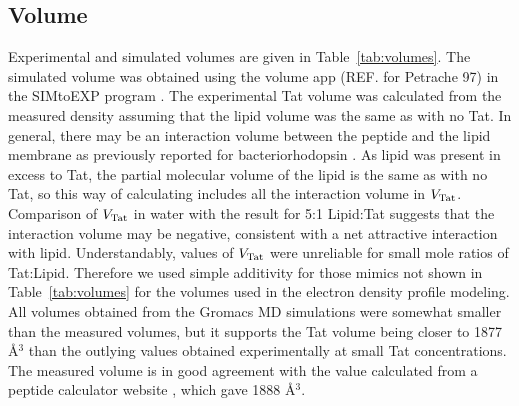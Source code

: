 \subsection{Volume}\label{sec:volume_results}
Experimental and simulated volumes are given in Table~\ref{tab:volumes}. The simulated volume was
obtained using the volume app (REF. for Petrache 97) in the SIMtoEXP program \cite{Kucerka10}. The experimental Tat volume was
calculated from the measured density assuming that the lipid volume was the same as with no
Tat. In general, there may be an interaction volume between the peptide and the lipid membrane
as previously reported for bacteriorhodopsin \cite{Tristram-Nagle86}. As lipid was present in excess to Tat, the
partial molecular volume of the lipid is the same as with no Tat, so this way of
calculating includes all the interaction volume in $V_\textrm{Tat}$. Comparison of $V_\textrm{Tat}$ in water with the
result for 5:1 Lipid:Tat suggests that the interaction volume may be negative, consistent with a
net attractive interaction with lipid. Understandably, values of $V_\textrm{Tat}$ were unreliable for small
mole ratios of Tat:Lipid. Therefore we used simple additivity for those mimics not shown in
Table~\ref{tab:volumes} for the volumes used in the electron density profile modeling. 
All volumes obtained from the Gromacs MD
simulations were somewhat smaller than the measured volumes, but it supports the Tat volume
being closer to 1877 \AA$^3$ than the outlying values obtained experimentally at small Tat
concentrations. The measured volume is in good agreement with the 
value calculated from a peptide calculator website \cite{peptide_calc}, which
gave 1888 \AA$^3$. 


